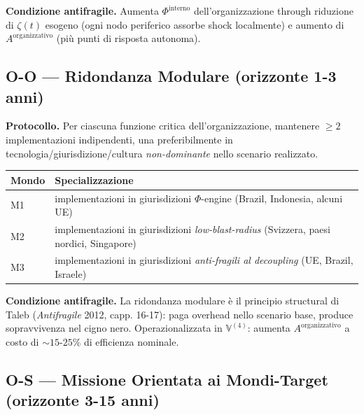 \Proved{} \textbf{Condizione antifragile.} Aumenta
\(\Phi^{\text{interno}}\) dell'organizzazione through riduzione di
\(\zeta(t)\) esogeno (ogni nodo periferico assorbe shock localmente) e
aumento di \(A^{\text{organizzativo}}\) (più punti di risposta
autonoma).

\subsection{O-O --- Ridondanza Modulare (orizzonte 1-3
anni)}\label{o-o-ridondanza-modulare-orizzonte-1-3-anni}

\Hypoth{} \textbf{Protocollo.} Per ciascuna funzione critica
dell'organizzazione, mantenere \(\geq 2\) implementazioni indipendenti,
una preferibilmente in tecnologia/giurisdizione/cultura
\emph{non-dominante} nello scenario realizzato.

{\def\LTcaptype{none} %
{\small\begin{longtable}[]{@{}
  >{\raggedright\arraybackslash}p{}
  >{\raggedright\arraybackslash}p{}@{}}
\toprule\noalign{}
\begin{minipage}[b]{\linewidth}\raggedright
Mondo
\end{minipage} & \begin{minipage}[b]{\linewidth}\raggedright
Specializzazione
\end{minipage} \\
\midrule\noalign{}
\endhead
\bottomrule\noalign{}
\endlastfoot
M1 & implementazioni in giurisdizioni \(\Phi\)-engine (Brazil,
Indonesia, alcuni UE) \\
M2 & implementazioni in giurisdizioni \emph{low-blast-radius} (Svizzera,
paesi nordici, Singapore) \\
M3 & implementazioni in giurisdizioni \emph{anti-fragili al decoupling}
(UE, Brazil, Israele) \\
\end{longtable}}
}

\Proved{} \textbf{Condizione antifragile.} La ridondanza modulare è il
principio structural di Taleb (\emph{Antifragile} 2012, capp. 16-17):
paga overhead nello scenario base, produce sopravvivenza nel cigno nero.
Operazionalizzata in \(\mathbb{V}^{(4)}\): aumenta
\(A^{\text{organizzativo}}\) a costo di \(\sim 15\)-\(25\%\) di
efficienza nominale.

\subsection{O-S --- Missione Orientata ai Mondi-Target (orizzonte 3-15
anni)}\label{o-s-missione-orientata-ai-mondi-target-orizzonte-3-15-anni}

